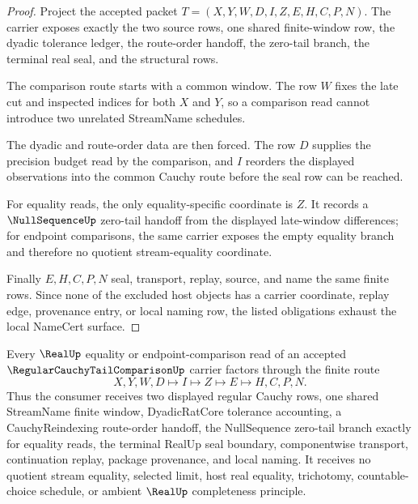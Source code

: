 \begin{proof}
Project the accepted packet $T=(X,Y,W,D,I,Z,E,H,C,P,N)$. The carrier exposes exactly the two source rows, one shared finite-window row, the dyadic tolerance ledger, the route-order handoff, the zero-tail branch, the terminal real seal, and the structural rows.

The comparison route starts with a common window. The row $W$ fixes the late cut and inspected indices for both $X$ and $Y$, so a comparison read cannot introduce two unrelated StreamName schedules.

The dyadic and route-order data are then forced. The row $D$ supplies the precision budget read by the comparison, and $I$ reorders the displayed observations into the common Cauchy route before the seal row can be reached.

For equality reads, the only equality-specific coordinate is $Z$. It records a $\NullSequenceUp$ zero-tail handoff from the displayed late-window differences; for endpoint comparisons, the same carrier exposes the empty equality branch and therefore no quotient stream-equality coordinate.

Finally $E,H,C,P,N$ seal, transport, replay, source, and name the same finite rows. Since none of the excluded host objects has a carrier coordinate, replay edge, provenance entry, or local naming row, the listed obligations exhaust the local NameCert surface.
\end{proof}

\begin{theorem}
\label{thm:regular-cauchy-tail-comparison-common-window-handoff}
Every $\RealUp$ equality or endpoint-comparison read of an accepted $\RegularCauchyTailComparisonUp$ carrier factors through the finite route
$$
X,Y,W,D \longmapsto I \longmapsto Z \longmapsto E \longmapsto H,C,P,N .
$$
Thus the consumer receives two displayed regular Cauchy rows, one shared StreamName finite window, DyadicRatCore tolerance accounting, a CauchyReindexing route-order handoff, the NullSequence zero-tail branch exactly for equality reads, the terminal RealUp seal boundary, componentwise transport, continuation replay, package provenance, and local naming. It receives no quotient stream equality, selected limit, host real equality, trichotomy, countable-choice schedule, or ambient $\RealUp$ completeness principle.
\end{theorem}

